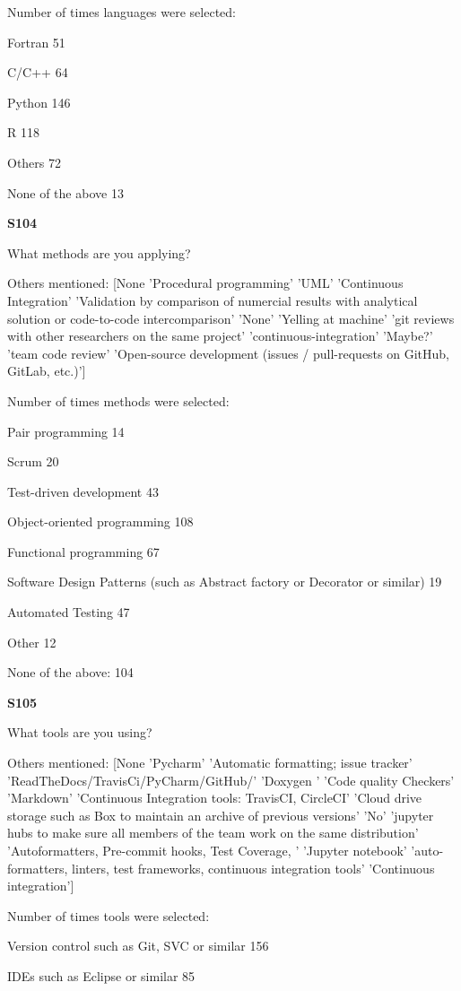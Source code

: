 Number of times languages were selected: 

 Fortran 51

 C/C++ 64

 Python 146

 R 118

 Others 72


None of the above 13

\textbf{S104}

What methods are you applying?

Others mentioned: [None 'Procedural programming' 'UML' 'Continuous Integration'
 'Validation by comparison of numercial results with analytical solution or code-to-code intercomparison'
 'None' 'Yelling at machine'
 'git reviews with other researchers on the same project'
 'continuous-integration' 'Maybe?' 'team code review'
 'Open-source development (issues / pull-requests on GitHub, GitLab, etc.)']

Number of times methods were selected: 

 Pair programming 14

 Scrum 20

 Test-driven development 43

 Object-oriented programming 108

 Functional programming 67

 Software Design Patterns (such as Abstract factory or Decorator or similar) 19

 Automated Testing 47

 Other 12

None of the above: 104

\textbf{S105}

What tools are you using?

Others mentioned: [None 'Pycharm' 'Automatic formatting; issue tracker'
 'ReadTheDocs/TravisCi/PyCharm/GitHub/' 'Doxygen ' 'Code quality Checkers'
 'Markdown' 'Continuous Integration tools: TravisCI, CircleCI'
 'Cloud drive storage such as Box to maintain an archive of previous versions'
 'No'
 'jupyter hubs to make sure all members of the team work on the same distribution'
 'Autoformatters, Pre-commit hooks, Test Coverage, ' 'Jupyter notebook'
 'auto-formatters, linters, test frameworks, continuous integration tools'
 'Continuous integration']

Number of times tools were selected: 

 Version control such as Git, SVC or similar 156

 IDEs such as Eclipse or similar 85


